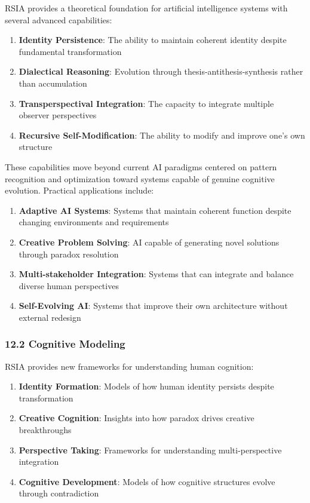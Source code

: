 \documentclass[12pt]{article}
\providecommand{\tightlist}{%
  \setlength{\itemsep}{0pt}\setlength{\parskip}{0pt}}
\begin{document}
RSIA provides a theoretical foundation for artificial intelligence
systems with several advanced capabilities:

\begin{enumerate}
\def\labelenumi{\arabic{enumi}.}
\tightlist
\item
  \textbf{Identity Persistence}: The ability to maintain coherent
  identity despite fundamental transformation
\item
  \textbf{Dialectical Reasoning}: Evolution through
  thesis-antithesis-synthesis rather than accumulation
\item
  \textbf{Transperspectival Integration}: The capacity to integrate
  multiple observer perspectives
\item
  \textbf{Recursive Self-Modification}: The ability to modify and
  improve one's own structure
\end{enumerate}

These capabilities move beyond current AI paradigms centered on pattern
recognition and optimization toward systems capable of genuine cognitive
evolution. Practical applications include:

\begin{enumerate}
\def\labelenumi{\arabic{enumi}.}
\tightlist
\item
  \textbf{Adaptive AI Systems}: Systems that maintain coherent function
  despite changing environments and requirements
\item
  \textbf{Creative Problem Solving}: AI capable of generating novel
  solutions through paradox resolution
\item
  \textbf{Multi-stakeholder Integration}: Systems that can integrate and
  balance diverse human perspectives
\item
  \textbf{Self-Evolving AI}: Systems that improve their own architecture
  without external redesign
\end{enumerate}

\subsubsection{12.2 Cognitive Modeling}\label{cognitive-modeling}

RSIA provides new frameworks for understanding human cognition:

\begin{enumerate}
\def\labelenumi{\arabic{enumi}.}
\tightlist
\item
  \textbf{Identity Formation}: Models of how human identity persists
  despite transformation
\item
  \textbf{Creative Cognition}: Insights into how paradox drives creative
  breakthroughs
\item
  \textbf{Perspective Taking}: Frameworks for understanding
  multi-perspective integration
\item
  \textbf{Cognitive Development}: Models of how cognitive structures
  evolve through contradiction
\end{enumerate}
\end{document}
